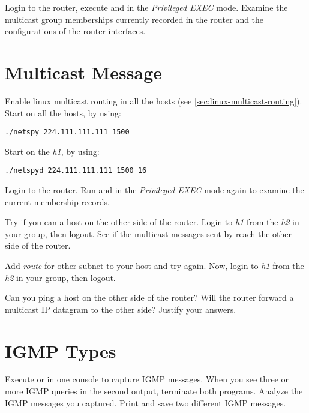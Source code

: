 \documentclass{../UTNetLab}
\begin{document}
Login to the router, execute  and  in the \textit{Privileged EXEC} mode.
Examine the multicast group memberships currently recorded in the router and the configurations of the router interfaces.

\section{Multicast Message}
Enable linux multicast routing in all the hosts (see \autoref{sec:linux-multicast-routing}).\\
Start  on all the hosts, by using:
\begin{lstlisting}
./netspy 224.111.111.111 1500
    \end{lstlisting}
Start  on the \textit{h1}, by using:
\begin{lstlisting}
./netspyd 224.111.111.111 1500 16
    \end{lstlisting}

Login to the router.
Run  and  in the \textit{Privileged EXEC} mode again to examine the current membership records.

Try if you can  a host on the other side of the router.
Login to \textit{h1} from the \textit{h2} in your group, then logout.
See if the multicast messages sent by  reach the other side of the router.

Add \textit{route} for other subnet to your host and try  again.
Now, login to \textit{h1} from the \textit{h2} in your group, then logout.

\begin{report}
    \item Can you ping a host on the other side of the router?
    Will the router forward a multicast IP datagram to the other side?
    Justify your answers.
\end{report}

\section{IGMP Types}
Execute  or  in one console to capture IGMP messages.
When you see three or more IGMP queries in the second  output, terminate both  programs.
Analyze the IGMP messages you captured.
Print and save two different IGMP messages.
\end{document}
